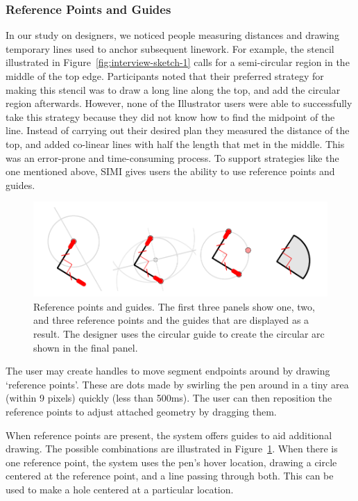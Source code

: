 \documentclass{article}
\begin{document}

\subsubsection{Reference Points and Guides}


In our study on designers, we noticed people measuring distances and
drawing temporary lines used to anchor subsequent linework. For
example, the stencil illustrated in
Figure~\ref{fig:interview-sketch-1} calls for a semi-circular region
in the middle of the top edge. Participants noted that their preferred
strategy for making this stencil was to draw a long line along the
top, and add the circular region afterwards. However, none of the
Illustrator users were able to successfully take this strategy because
they did not know how to find the midpoint of the line. Instead of
carrying out their desired plan they measured the distance of the top,
and added co-linear lines with half the length that met in the
middle. This was an error-prone and time-consuming process. To support
strategies like the one mentioned above, SIMI gives users the ability
to use reference points and guides.

\begin{figure}[h]
  \centering
  \includegraphics[width=0.9\linewidth]{img/guides-all.pdf}
  \caption{Reference points and guides. The first three panels show
    one, two, and three reference points and the guides that are
    displayed as a result. The designer uses the circular guide to
    create the circular arc shown in the final panel.}
  \label{fig:guides}
\end{figure}

The user may create handles to move segment endpoints around by
drawing `reference points'. These are dots made by swirling the pen
around in a tiny area (within 9 pixels) quickly (less than 500ms). The
user can then reposition the reference points to adjust attached
geometry by dragging them.

When reference points are present, the system offers guides to aid
additional drawing. The possible combinations are illustrated in
Figure~\ref{fig:guides}. When there is one reference point, the system
uses the pen's hover location, drawing a circle centered at the
reference point, and a line passing through both. This can be used to
make a hole centered at a particular location.
\end{document}
